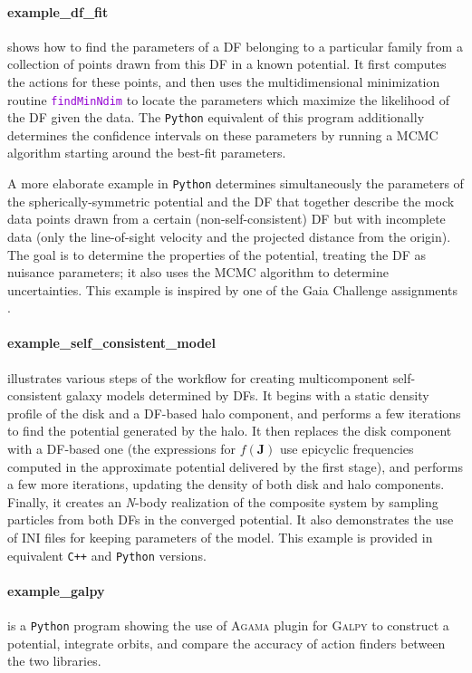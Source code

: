 \documentclass[12pt]{article}
\newcommand{\Agama}{\textsc{Agama}\xspace}
\newcommand{\Galpy}{\textsc{Galpy}\xspace}
\newcommand{\Nbody}{\textsl{N}-body\xspace}
\newcommand{\Cpp}  {\texttt{C++}\xspace}
\newcommand{\Python}{\texttt{Python}\xspace}
\newcommand{\ttt}[1]{\textcolor{darkviolet}{\texttt{#1}}}
\newcommand{\bJ}{\boldsymbol{J}}
\begin{document}
\paragraph{example_df_fit} shows how to find the parameters of a DF belonging to a particular family from a collection of points drawn from this DF in a known potential. It first computes the actions for these points, and then uses the multidimensional minimization routine \ttt{findMinNdim} to locate the parameters which maximize the likelihood of the DF given the data.
The \Python equivalent of this program additionally determines the confidence intervals on these parameters by running a MCMC algorithm starting around the best-fit parameters.

A more elaborate example in \Python determines simultaneously the parameters of the spherically-symmetric potential and the DF that together describe the mock data points drawn from a certain (non-self-consistent) DF but with incomplete data (only the line-of-sight velocity and the projected distance from the origin). The goal is to determine the properties of the potential, treating the DF as nuisance parameters; it also uses the MCMC algorithm to determine uncertainties. 
This example is inspired by one of the Gaia Challenge assignments \cite{Read2017}.

\paragraph{example_self_consistent_model} illustrates various steps of the workflow for creating multicomponent self-consistent galaxy models determined by DFs. It begins with a static density profile of the disk and a DF-based halo component, and performs a few iterations to find the potential generated by the halo. It then replaces the disk component with a DF-based one (the expressions for $f(\bJ)$ use epicyclic frequencies computed in the approximate potential delivered by the first stage), and performs a few more iterations, updating the density of both disk and halo components. Finally, it creates an \Nbody realization of the composite system by sampling particles from both DFs in the converged potential. It also demonstrates the use of INI files for keeping parameters of the model. This example is provided in equivalent \Cpp and \Python versions.

\paragraph{example_galpy} is a \Python program showing the use of \Agama plugin for \Galpy to construct a potential, integrate orbits, and compare the accuracy of action finders between the two libraries. 
\end{document}
